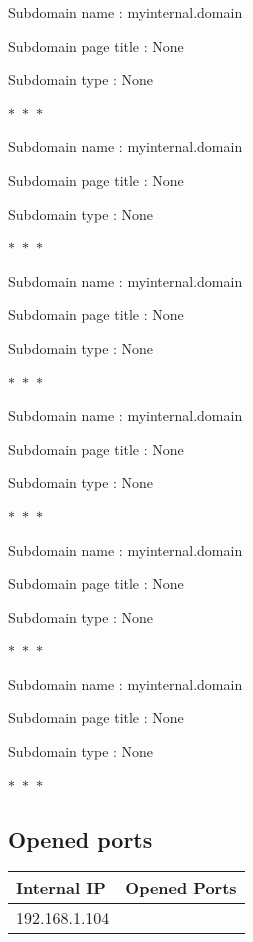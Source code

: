 \documentclass[a4paper,11pt]{book}
\begin{document}
\begin{itemize}
        Subdomain name : myinternal.domain

        Subdomain page title : None

        Subdomain type : None

        \begin{center}
            $\ast$~$\ast$~$\ast$
        \end{center}

        Subdomain name : myinternal.domain

        Subdomain page title : None

        Subdomain type : None

        \begin{center}
            $\ast$~$\ast$~$\ast$
        \end{center}

        Subdomain name : myinternal.domain

        Subdomain page title : None

        Subdomain type : None

        \begin{center}
            $\ast$~$\ast$~$\ast$
        \end{center}

        Subdomain name : myinternal.domain

        Subdomain page title : None

        Subdomain type : None

        \begin{center}
            $\ast$~$\ast$~$\ast$
        \end{center}

        Subdomain name : myinternal.domain

        Subdomain page title : None

        Subdomain type : None

        \begin{center}
            $\ast$~$\ast$~$\ast$
        \end{center}

        Subdomain name : myinternal.domain

        Subdomain page title : None

        Subdomain type : None

        \begin{center}
            $\ast$~$\ast$~$\ast$
        \end{center}

    
        \subsection{Opened ports}
        \begin{tabular}{|p{3cm}|>{\raggedright}p{8cm}|} 
        \hline
        Internal IP & Opened Ports \tabularnewline [0.5ex] 
        \hline
            192.168.1.104 &


\end{tabular}
\end{itemize}
\end{document}
